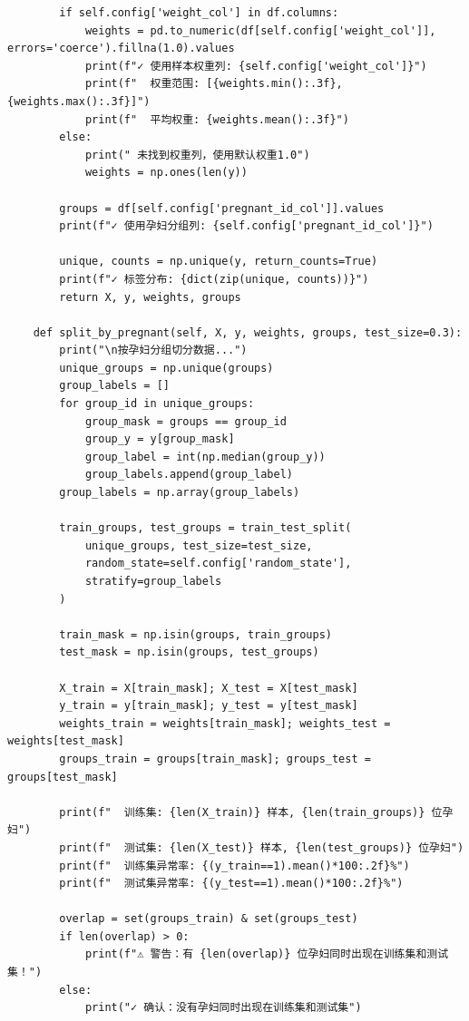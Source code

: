 \begin{lstlisting}
        if self.config['weight_col'] in df.columns:
            weights = pd.to_numeric(df[self.config['weight_col']], errors='coerce').fillna(1.0).values
            print(f"✓ 使用样本权重列: {self.config['weight_col']}")
            print(f"  权重范围: [{weights.min():.3f}, {weights.max():.3f}]")
            print(f"  平均权重: {weights.mean():.3f}")
        else:
            print(" 未找到权重列，使用默认权重1.0")
            weights = np.ones(len(y))

        groups = df[self.config['pregnant_id_col']].values
        print(f"✓ 使用孕妇分组列: {self.config['pregnant_id_col']}")

        unique, counts = np.unique(y, return_counts=True)
        print(f"✓ 标签分布: {dict(zip(unique, counts))}")
        return X, y, weights, groups

    def split_by_pregnant(self, X, y, weights, groups, test_size=0.3):
        print("\n按孕妇分组切分数据...")
        unique_groups = np.unique(groups)
        group_labels = []
        for group_id in unique_groups:
            group_mask = groups == group_id
            group_y = y[group_mask]
            group_label = int(np.median(group_y))
            group_labels.append(group_label)
        group_labels = np.array(group_labels)

        train_groups, test_groups = train_test_split(
            unique_groups, test_size=test_size,
            random_state=self.config['random_state'],
            stratify=group_labels
        )

        train_mask = np.isin(groups, train_groups)
        test_mask = np.isin(groups, test_groups)

        X_train = X[train_mask]; X_test = X[test_mask]
        y_train = y[train_mask]; y_test = y[test_mask]
        weights_train = weights[train_mask]; weights_test = weights[test_mask]
        groups_train = groups[train_mask]; groups_test = groups[test_mask]

        print(f"  训练集: {len(X_train)} 样本, {len(train_groups)} 位孕妇")
        print(f"  测试集: {len(X_test)} 样本, {len(test_groups)} 位孕妇")
        print(f"  训练集异常率: {(y_train==1).mean()*100:.2f}%")
        print(f"  测试集异常率: {(y_test==1).mean()*100:.2f}%")

        overlap = set(groups_train) & set(groups_test)
        if len(overlap) > 0:
            print(f"⚠️ 警告：有 {len(overlap)} 位孕妇同时出现在训练集和测试集！")
        else:
            print("✓ 确认：没有孕妇同时出现在训练集和测试集")


\end{lstlisting}
